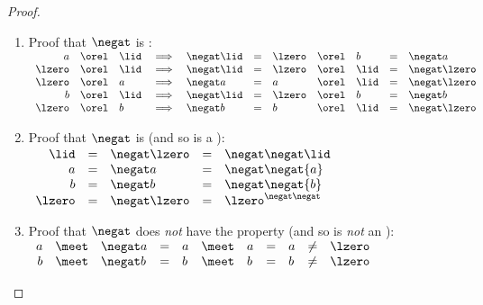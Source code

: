 \begin{proof}
\begin{enumerate}
  \item Proof that $\negat$ is :
    $\begin{array}[t]{rcl c lcl c lclc}
      a      &\orel& \lid &\implies& \negat\lid &=& \lzero &\orel& b    &=&  \negat a     \\
      \lzero &\orel& \lid &\implies& \negat\lid &=& \lzero &\orel& \lid &=& \negat\lzero \\
      \lzero &\orel& a    &\implies&  \negat a   &=& a      &\orel& \lid &=& \negat\lzero \\
      b      &\orel& \lid &\implies& \negat\lid &=& \lzero &\orel& b    &=&  \negat b     \\
      \lzero &\orel& b    &\implies&  \negat b   &=& b      &\orel& \lid &=& \negat\lzero 
    \end{array}$

  \item Proof that $\negat$ is  (and so is a ):
    $\begin{array}[t]{rcl cl}
      \lid   &=& \negat\lzero &=& \negat\negat\lid   \\
      a      &=& \negat a      &=& \negat\negat{a}      \\
      b      &=& \negat b      &=& \negat\negat{b}      \\
      \lzero &=& \negat\lzero &=& \lzero^{\negat\negat} \\
    \end{array}$

  \item Proof that $\negat$ does \emph{not} have the  property (and so is \emph{not} an ):
    \\$\begin{array}[t]{rcl clclclcl}
      a      &\meet& \negat a      &=& a      &\meet& a      &=& a &\neq& \lzero \\
      b      &\meet& \negat b      &=& b      &\meet& b      &=& b &\neq& \lzero 
    \end{array}$


\end{enumerate}
\end{proof}

